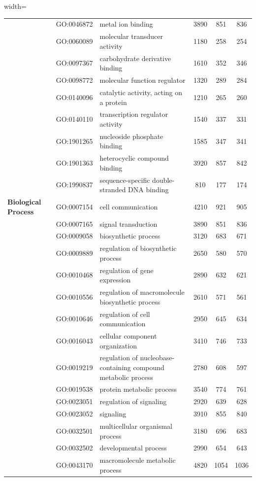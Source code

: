 \documentclass[10pt]{article}
\begin{document}
\begin{table}[h!]
\begin{adjustbox}{width=\textwidth}
\begin{tabular}{lllccc}
& GO:0046872 & metal ion binding & 3890 & 851 & 836 \\
& GO:0060089 & molecular transducer activity & 1180 & 258 & 254 \\
& GO:0097367 & carbohydrate derivative binding & 1610 & 352 & 346 \\
& GO:0098772 & molecular function regulator & 1320 & 289 & 284 \\
& GO:0140096 & catalytic activity, acting on a protein & 1210 & 265 & 260 \\
& GO:0140110 & transcription regulator activity & 1540 & 337 & 331 \\
& GO:1901265 & nucleoside phosphate binding & 1585 & 347 & 341 \\
& GO:1901363 & heterocyclic compound binding & 3920 & 857 & 842 \\
& GO:1990837 & sequence-specific double-stranded DNA binding & 810 & 177 & 174 \\
\midrule
\textbf{Biological Process} & GO:0007154 & cell communication & 4210 & 921 & 905 \\
& GO:0007165 & signal transduction & 3890 & 851 & 836 \\
& GO:0009058 & biosynthetic process & 3120 & 683 & 671 \\
& GO:0009889 & regulation of biosynthetic process & 2650 & 580 & 570 \\
& GO:0010468 & regulation of gene expression & 2890 & 632 & 621 \\
& GO:0010556 & regulation of macromolecule biosynthetic process & 2610 & 571 & 561 \\
& GO:0010646 & regulation of cell communication & 2950 & 645 & 634 \\
& GO:0016043 & cellular component organization & 3410 & 746 & 733 \\
& GO:0019219 & regulation of nucleobase-containing compound metabolic process & 2780 & 608 & 597 \\
& GO:0019538 & protein metabolic process & 3540 & 774 & 761 \\
& GO:0023051 & regulation of signaling & 2920 & 639 & 628 \\
& GO:0023052 & signaling & 3910 & 855 & 840 \\
& GO:0032501 & multicellular organismal process & 3180 & 696 & 683 \\
& GO:0032502 & developmental process & 2990 & 654 & 643 \\
& GO:0043170 & macromolecule metabolic process & 4820 & 1054 & 1036 \\

\end{tabular}
\end{adjustbox}
\end{table}
\end{document}
